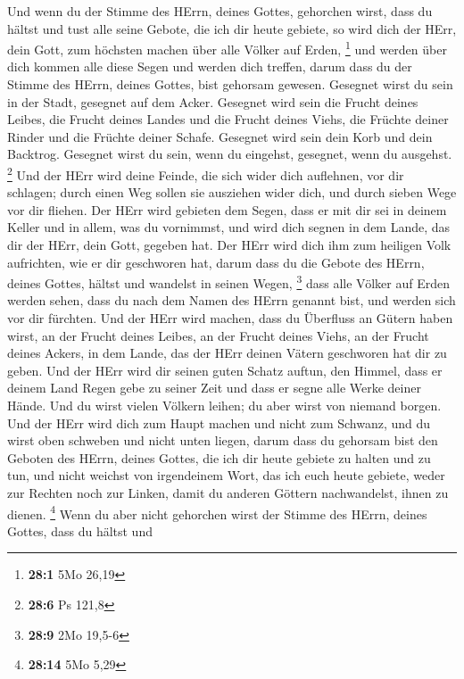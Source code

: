  Und wenn du der Stimme des HErrn, deines Gottes, gehorchen
wirst, dass du hältst und tust alle seine Gebote, die ich dir heute
gebiete, so wird dich der HErr, dein Gott, zum höchsten machen über alle
Völker auf Erden, \footnote{\textbf{28:1} 5Mo 26,19}  und
werden über dich kommen alle diese Segen und werden dich treffen, darum
dass du der Stimme des HErrn, deines Gottes, bist gehorsam gewesen.
 Gesegnet wirst du sein in der Stadt, gesegnet auf dem
Acker.  Gesegnet wird sein die Frucht deines Leibes, die
Frucht deines Landes und die Frucht deines Viehs, die Früchte deiner
Rinder und die Früchte deiner Schafe.  Gesegnet wird sein
dein Korb und dein Backtrog.  Gesegnet wirst du sein, wenn
du eingehst, gesegnet, wenn du ausgehst. \footnote{\textbf{28:6} Ps
  121,8}  Und der HErr wird deine Feinde, die sich wider
dich auflehnen, vor dir schlagen; durch einen Weg sollen sie ausziehen
wider dich, und durch sieben Wege vor dir fliehen.  Der HErr
wird gebieten dem Segen, dass er mit dir sei in deinem Keller und in
allem, was du vornimmst, und wird dich segnen in dem Lande, das dir der
HErr, dein Gott, gegeben hat.  Der HErr wird dich ihm zum
heiligen Volk aufrichten, wie er dir geschworen hat, darum dass du die
Gebote des HErrn, deines Gottes, hältst und wandelst in seinen Wegen,
\footnote{\textbf{28:9} 2Mo 19,5-6}  dass alle Völker auf
Erden werden sehen, dass du nach dem Namen des HErrn genannt bist, und
werden sich vor dir fürchten.  Und der HErr wird machen,
dass du Überfluss an Gütern haben wirst, an der Frucht deines Leibes, an
der Frucht deines Viehs, an der Frucht deines Ackers, in dem Lande, das
der HErr deinen Vätern geschworen hat dir zu geben.  Und
der HErr wird dir seinen guten Schatz auftun, den Himmel, dass er deinem
Land Regen gebe zu seiner Zeit und dass er segne alle Werke deiner
Hände. Und du wirst vielen Völkern leihen; du aber wirst von niemand
borgen.  Und der HErr wird dich zum Haupt machen und nicht
zum Schwanz, und du wirst oben schweben und nicht unten liegen, darum
dass du gehorsam bist den Geboten des HErrn, deines Gottes, die ich dir
heute gebiete zu halten und zu tun,  und nicht weichst von
irgendeinem Wort, das ich euch heute gebiete, weder zur Rechten noch zur
Linken, damit du anderen Göttern nachwandelst, ihnen zu dienen.
\footnote{\textbf{28:14} 5Mo 5,29}  Wenn du aber nicht
gehorchen wirst der Stimme des HErrn, deines Gottes, dass du hältst und

